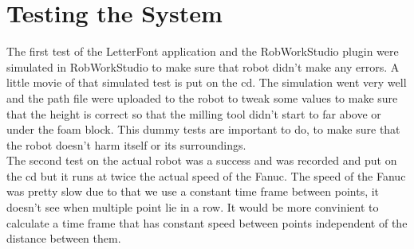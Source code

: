 \section{Testing the System}
\label{sec:test}

The first test of the LetterFont application and the RobWorkStudio plugin were simulated in RobWorkStudio to make sure that robot didn't make any errors. A little movie of that simulated test is put on the cd. The simulation went very well and the path file were uploaded to the robot to tweak some values to make sure that the height is correct so that the milling tool didn't start to far above or under the foam block. This dummy tests are important to do, to make sure that the robot doesn't harm itself or its surroundings.
\\The second test on the actual robot was a success and was recorded and put on the cd but it runs at twice the actual speed of the Fanuc. The speed of the Fanuc was pretty slow due to that we use a constant time frame between points, it doesn't see when multiple point lie in a row. It would be more convinient to calculate a time frame that has constant speed between points independent of the distance between them.